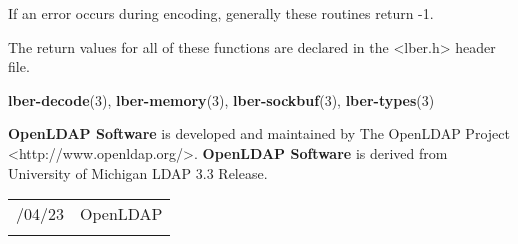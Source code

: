 \documentclass[]{article}
\let\realtextbf=\textbf
\renewcommand{\textbf}[1]{\textcolor{boldcolor}{\realtextbf{#1}}}
\begin{document}
If an error occurs during encoding, generally these routines return -1.


The return values for all of these functions are declared in the
\textless{}lber.h\textgreater{} header file.


\textbf{lber-decode}(3), \textbf{lber-memory}(3),
\textbf{lber-sockbuf}(3), \textbf{lber-types}(3)


\textbf{OpenLDAP Software} is developed and maintained by The OpenLDAP
Project \textless{}http://www.openldap.org/\textgreater{}.
\textbf{OpenLDAP Software} is derived from University of Michigan LDAP
3.3 Release.

\begin{longtable}[c]{@{}ll@{}}
\toprule\addlinespace
2012/04/23 & OpenLDAP
\\\addlinespace
\bottomrule
\end{longtable}
\end{document}
